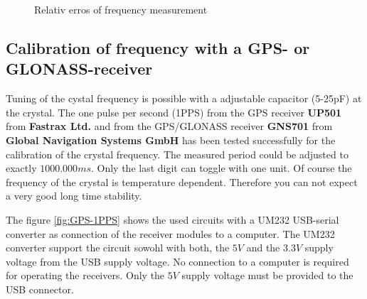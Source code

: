 \begin{figure}[H]
\centering

\caption{Relativ erros of frequency measurement}
\label{fig:freq-ppm}
\end{figure}

\subsection{Calibration of frequency with a GPS- or GLONASS-receiver}

Tuning of the cystal frequency is possible with a adjustable capacitor (5-25pF) at the crystal.
The one pulse per second (1PPS) from the GPS receiver {\bf UP501} from {\bf Fastrax Ltd.} and from the GPS/GLONASS receiver
{\bf GNS701} from {\bf Global Navigation Systems GmbH} has been tested successfully for the calibration of the
crystal frequency.
The measured period could be adjusted to exactly \(1000.000ms\).
Only the last digit can toggle with one unit.
Of course the frequency of the crystal is temperature dependent.
Therefore you can not expect a very good long time stability.

The figure \ref{fig:GPS-1PPS} shows the used circuits with a UM232 USB-serial converter
as connection of the receiver modules to a computer.
The UM232 converter support the circuit sowohl with both, the \(5V\) and the \(3.3V\) supply voltage
from the USB supply voltage.
No connection to a computer is required for operating the receivers.
Only the \(5V\) supply voltage must be provided to the USB connector.

